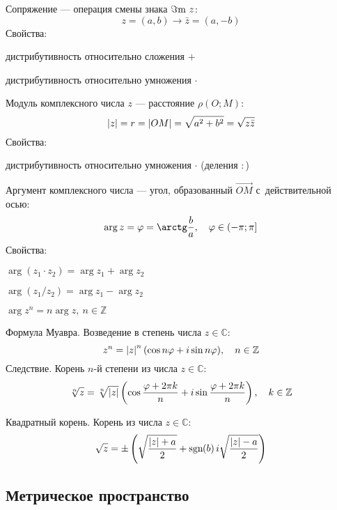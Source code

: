 \begin{theorem}
{\bold Сопряжение} --- операция смены знака $\Im\text{m}\ z$:
$$z=(a,b)\to\bar{z}=(a,-b)$$
Свойства:
\begin{list*}
\item дистрибутивность относительно {\ital сложения} $+$
\item дистрибутивность относительно {\ital умножения} $\cdot$
\end{list*}
\end{theorem}
\begin{theorem}
{\bold Модуль} комплексного числа $z$ --- расстояние $\rho(O;M)$:
$$\left|z\right|=r=\left|OM\right|=\sqrt{a^2+b^2}=\sqrt{z\bar{z}}$$
Свойства:
\begin{list*}
\item дистрибутивность относительно {\ital умножения} $\cdot$ {\ital (деления $\colon$)}
\end{list*}
\end{theorem}
\begin{theorem}
{\bold Аргумент} комплексного числа --- угол, образованный $\overrightarrow{OM}$ с~действительной осью:
$$\arg z=\varphi=\arctg\frac{b}{a},\quad\varphi\in(-\pi;\pi]$$
Свойства:
\begin{list*}
\item $\arg(z_1\cdot z_2)=\arg z_1+\arg z_2$
\item $\arg(z_1\slash z_2)=\arg z_1-\arg z_2$
\item $\arg z^n=n\arg z,\ n\in\mathbb{Z}$
\end{list*}
\end{theorem}
\begin{theorem}
{\bold Формула Муавра.} Возведение в степень числа $z\in\mathbb{C}$:
$$z^n=\abs{z}^n(\cos n\varphi+i\sin n\varphi),\quad n\in\mathbb{Z}$$
{\bold Следствие.} Корень $n$-й степени из числа $z\in\mathbb{C}$:
$$\sqrt[n]{z}=\sqrt[n]{\abs{z}}\left(\cos\frac{\varphi+2\pi k}{n}+i\sin\frac{\varphi+2\pi k}{n}\right),\quad k\in\mathbb{Z}$$
\end{theorem}
\begin{theorem}
{\bold Квадратный корень.} Корень из числа $z\in\mathbb{C}$:
$$\sqrt{z}=\pm\left(\sqrt{\frac{\left|z\right|+a}{2}}+\text{sgn}\hspace*{-2pt}\left(b\right)i\sqrt{\frac{\left|z\right|-a}{2}}\right)$$
\end{theorem}

\subsection{Метрическое пространство}

